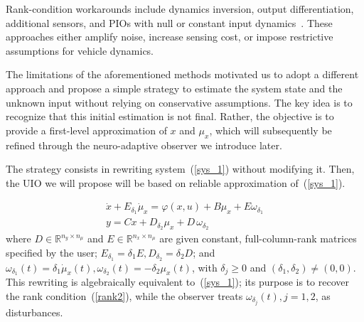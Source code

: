 \documentclass{ifacconf}
\def\eqref#1{(\ref{#1})}
\begin{document}



Rank-condition workarounds include dynamics inversion, output differentiation, additional sensors, and PIOs with null or constant input dynamics~\citep{Hou:256351,Phanomchoeng:ASME/TM14,PIO_1995,PIOreview}. These approaches either amplify noise, increase sensing cost, or impose restrictive assumptions for vehicle dynamics. 

The limitations of the aforementioned methods motivated us to adopt a different approach and propose a simple strategy to estimate the system state and the unknown input without relying on conservative assumptions. The key idea is to recognize that this initial estimation is not final. Rather, the objective is to provide a first-level approximation of $x$ and $\mu_{x}$, which will subsequently be refined through the neuro-adaptive observer we introduce later.


The strategy consists in rewriting system~\eqref{sys_1} without modifying it. Then, the UIO we will propose will be based on reliable approximation of~\eqref{sys_1}.

\begin{equation}\label{ali_syst1}
    \begin{array}{l}
        \dot{x} + E_{\delta_1} \dot{\mu}_{x} = \varphi(x,u) + B\mu_{x} + E \omega_{\delta_{1}} \\
        y = Cx + D_{\delta_2} \mu_{x} + D\, \omega_{\delta_{2}} 
    \end{array}
\end{equation}
where $D \in \mathbb{R}^{n_y \times n_{\mu}}$ and $E \in \mathbb{R}^{n_x \times n_{\mu}}$ are given constant, full-column-rank matrices specified by the user; $E_{\delta_1} = \delta_{1} E, D_{\delta_2} = \delta_{2} D$; and $\omega_{\delta_{1}}(t) = \delta_{1} \dot{\mu}_{x}(t), \omega_{\delta_{2}}(t) = -\delta_{2} \mu_{x}(t)$, with $\delta_{j} \geq 0$ and $(\delta_1,\delta_2) \neq (0,0)$. This rewriting is algebraically equivalent to~\eqref{sys_1}; its purpose is to recover the rank condition~\eqref{rank2}, while the observer treats $\omega_{\delta_{j}}(t), j=1,2$, as disturbances.
\end{document}
